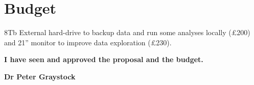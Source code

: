\documentclass[11pt]{article}
\begin{document}
\begin{linenumbers}
\begin{table}[ht!]
\begin{center}
\begin{tabular}{l||c|c|c|c|c|c}
        \end{tabular}
        \end{center}
        \label{table: Akaike and Schwarz weights}
    \end{table}
    
    \section{Budget}
    
    8Tb External hard-drive to backup data and run some analyses locally (£200) and 21” monitor to improve data exploration (£230).

    
    

    \end{linenumbers}    

    \pagebreak
    \hspace{50pt}
    \vfill
    
    \begin{center}
    
    \textbf{I have seen and approved the proposal and the budget.}
   
    \hfill \break
   
    \textbf{Dr Peter Graystock}   
    
    \end{center}
    
    \vfill
    \hspace{0pt}
    \pagebreak
\end{document}
